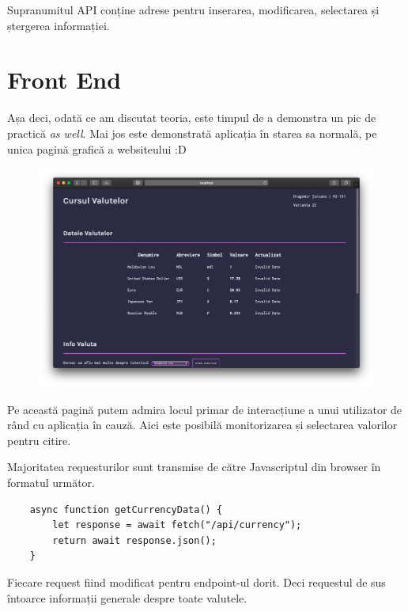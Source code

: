 \documentclass[12pt. a4paper]{report}
\begin{document}
Supranumitul API conține adrese pentru inserarea, modificarea, selectarea și ștergerea informației.

\section{Front End}
Așa deci, odată ce am discutat teoria, este timpul de a demonstra un pic de practică \emph{as well}. Mai jos este demonstrată aplicația în starea sa normală, pe unica pagină grafică a websiteului :D

\begin{figure}[H]
\centering
	\includegraphics[width=1.0\textwidth]{homepage}
\end{figure}

Pe această pagină putem admira locul primar de interacțiune a unui utilizator de rând cu aplicația în cauză. Aici este posibilă monitorizarea și selectarea valorilor pentru citire.

Majoritatea requesturilor sunt transmise de către Javascriptul din browser în formatul următor.


\begin{verbatim}
    async function getCurrencyData() {
        let response = await fetch("/api/currency");
        return await response.json();
    }
\end{verbatim}

Fiecare request fiind modificat pentru endpoint-ul dorit. Deci requestul de sus întoarce informații generale despre toate valutele.
\end{document}
